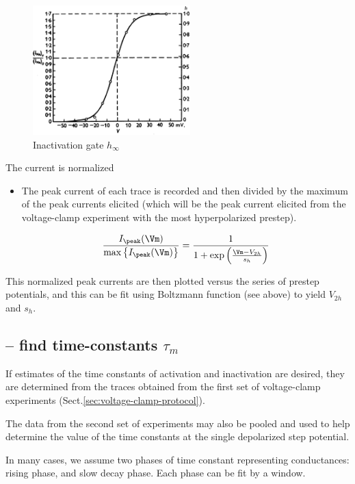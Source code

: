 \begin{figure}[htb]
  \centerline{\includegraphics[height=5cm]{./images/inactivation-gate-h-infinity.eps}}
  \caption{Inactivation gate $h_\infty$}\label{fig:inactivation-gate-h-infinity}
\end{figure}


The current is normalized
\begin{itemize}

  \item  The peak current of
each trace is recorded and then divided by the maximum of the peak currents
elicited (which will be the peak current elicited from the voltage-clamp
experiment with the most hyperpolarized prestep).

\begin{equation}
\frac{I_\peak(\Vm)}{\max\left\{ I_\peak(\Vm) \right\}} = \frac{1}{1 + \exp\left(
\frac{\Vm - V_{2h}}{s_h} \right)}
\end{equation}
\end{itemize}

This normalized peak currents are then plotted versus the series of prestep
potentials, and this can be fit using Boltzmann function (see above) to yield
$V_{2h}$ and $s_h$.

\subsection[-- find time-constants tau-m]{-- find time-constants
$\tau_m$}

If estimates of the time constants of activation and inactivation are desired,
they are determined from the traces obtained from the first set of voltage-clamp
experiments (Sect.\ref{sec:voltage-clamp-protocol}).

The data from the second set of experiments may also be pooled and used to help
determine the value of the time constants at the single depolarized step
potential.

In many cases, we assume two phases of time constant representing conductances:
rising phase, and slow decay phase. Each phase can be fit by a window.


